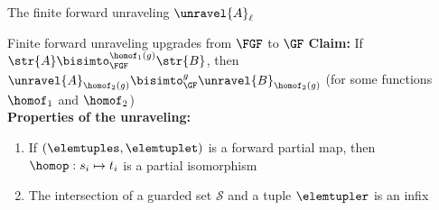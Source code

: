 \documentclass[aspectratio=169]{beamer}
\begin{document}
\begin{frame}{The finite forward unraveling $\unravel{A}_{\ell}$}
  
\end{frame}

\begin{frame}{Finite forward unraveling upgrades from $\FGF$ to $\GF$}
  \textbf{Claim:} If $\str{A} \bisimto_{\FGF}^{\homof_{1}(g)} \str{B}$, then $\unravel{A}_{\homof_{2}(g)} \bisimto_{\GF}^{g} \unravel{B}_{\homof_{2}(g)}$ (for some functions $\homof_{1}$ and $\homof_{2}$)\\[1.5em]

  \textbf{Properties of the unraveling:}\\[0.5em]
  \begin{enumerate}
    \item If $(\elemtuples, \elemtuplet)$ is a forward partial map, then $\homop: s_{i} \mapsto t_{i}$ is a partial isomorphism
          \vspace{0.5em}

          
    \item<2> The intersection of a guarded set $\mathcal{S}$ and a tuple $\elemtupler$ is an infix
          \vspace{0.5em}

          
  \end{enumerate}
\end{frame}
\end{document}
